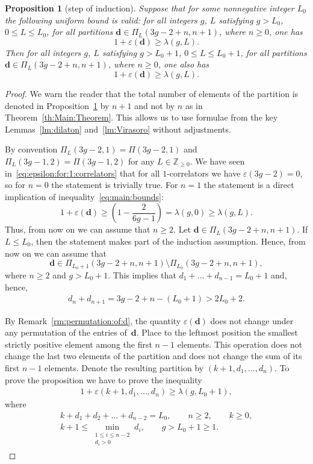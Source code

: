 \documentclass[pdftex]{sigma}
\renewcommand{\epsilon}{\varepsilon}
\newcommand\Z{\mathbb Z}
\newtheorem{Proposition}[Theorem]{Proposition}
\theoremstyle{definition}
\begin{document}
\begin{Proposition}[step of induction] \label{eq:prop:step:of:induction}
Suppose that for some nonnegative integer $L_0$
the following uniform bound is valid:
for all integers $g$, $L$ satisfying $g> L_0$, $0\le L\le L_0$,
for all partitions $\boldsymbol{d}\in\Pi_L(3g-2+n,n+1)$,
where $n\ge 0$, one has
\[
1+\epsilon(\boldsymbol{d})\ge \lambda(g,L) .
\]
Then for all integers $g$, $L$
satisfying $g> L_0+1$,
$0\le L\le L_0+1$,
for all partitions $\boldsymbol{d}\in\Pi_L(3g-2+n,n+1)$,
where $n\ge 0$, one also has
\[
1+\epsilon(\boldsymbol{d})\ge \lambda(g,L) .
\]
\end{Proposition}

\begin{proof}
We warn the reader that the total number of elements of the
partition is denoted in
Proposition~\ref{eq:prop:step:of:induction} by $n+1$ and
not by $n$ as in Theorem~\ref{th:Main:Theorem}. This allows
us to use formulae from the key Lemmas~\ref{lm:dilaton}
and~\ref{lm:Virasoro} without adjustments.

By convention $\Pi_L(3g-2,1)=\Pi(3g-2,1)$ and
$\Pi_L(3g-1,2)=\Pi(3g-1,2)$ for any $L\in\Z_{\ge 0}$.
We have seen in~\eqref{eq:epsilon:for:1:correlators}
that for all $1$-correlators we have
$\epsilon(3g-2)=0$,
so for $n=0$ the statement is trivially true.
For $n=1$ the statement is a direct implication
of inequality~\eqref{eq:main:bounds}:
\[
1+\epsilon(\boldsymbol{d})
\ge \left(1-\frac{2}{6g-1}\right)
=\lambda(g,0)
\ge\lambda(g,L) .
\]
Thus, from now on we can assume that $n\ge 2$. Let $\boldsymbol{d}\in\Pi_L(3g-2+n,n+1)$. If $L\le L_0$, then the statement makes part of the induction assumption. Hence, from now on we can assume that
\[
\boldsymbol{d}\in\Pi_{L_0+1}(3g-2+n,n+1)\setminus\Pi_{L_0}(3g-2+n,n+1) ,
\]
where $n\ge 2$ and $g> L_0+1$. This implies that
$d_1+\dots+d_{n-1}=L_0+1$ and, hence,
\begin{gather*}%
d_{n}+d_{n+1}=3g-2+n-(L_0+1)> 2L_0+2 .
\end{gather*}

By Remark~\ref{rm:permutation:of:d}, the quantity $\epsilon(\boldsymbol{d})$ does not change under any permutation of the entries of~$\boldsymbol{d}$. Place to the leftmost position the smallest strictly positive element among the first $n-1$ elements. This operation does not change the last two elements of the partition and does not change the sum of its first $n-1$ elements. Denote the resulting partition by $(k+1,d_1,\dots,d_n)$. To prove the proposition we have to prove the inequality
\begin{gather}\label{eq:desired:inequality}
1+\epsilon(k+1,d_1,\dots,d_n)\ge \lambda(g,L_0+1) ,
\end{gather}
where
\begin{gather}
k+d_1+d_2+\dots+d_{n-2}=L_0 ,\qquad n\ge 2,\qquad k\ge 0 ,\nonumber\\
 k+1\le\min_{\substack{1\le i\le n-2\\d_i>0}} d_i ,\qquad g>L_0+1\ge 1 .\label{eq:restrictions}
\end{gather}


\end{proof}
\end{document}
